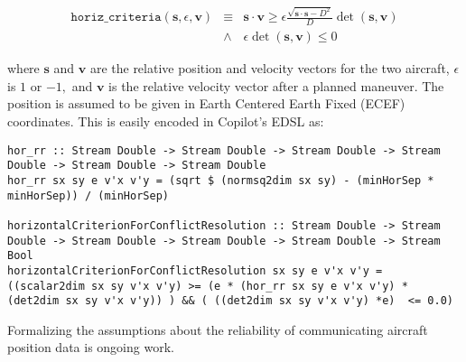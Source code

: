 \begin{eqnarray*} \texttt{horiz\_criteria}(\bm{s}, \epsilon, \bm{v})
& \equiv &  \bm{s} \cdot \bm{v} \geq \epsilon  \frac{\sqrt{\bm{s} \cdot
  \bm{s}  - D^2}} {D} \operatorname{det}(\bm{s},\bm{v})  \\
& \wedge &  \epsilon \operatorname{det}(\bm{s},\bm{v})  \leq  0 
\end{eqnarray*}

\noindent 
where $\bm{s}$ and $\bm{v}$ are the  relative position  and velocity
vectors for the two aircraft, $\epsilon$ is $1$ or $-1,$  and 
$\bm{v}$ is the relative velocity vector after a planned maneuver. 
The position is  assumed to be given in Earth Centered Earth Fixed (ECEF)
coordinates.  This is easily encoded in  Copilot's EDSL as:

%
%
%
%
\begin{lstlisting}[frame=single]
hor_rr :: Stream Double -> Stream Double -> Stream Double -> Stream Double -> Stream Double -> Stream Double
hor_rr sx sy e v'x v'y = (sqrt $ (normsq2dim sx sy) - (minHorSep * minHorSep)) / (minHorSep)

horizontalCriterionForConflictResolution :: Stream Double -> Stream Double -> Stream Double -> Stream Double -> Stream Double -> Stream Bool
horizontalCriterionForConflictResolution sx sy e v'x v'y = ((scalar2dim sx sy v'x v'y) >= (e * (hor_rr sx sy e v'x v'y) * (det2dim sx sy v'x v'y)) ) && ( ((det2dim sx sy v'x v'y) *e)  <= 0.0)
\end{lstlisting}

Formalizing the assumptions about the reliability of communicating
aircraft position data is ongoing work. 


 








